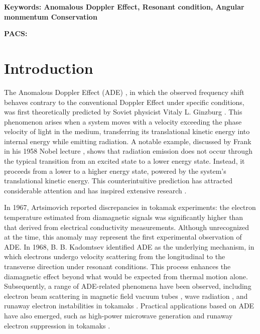 \documentclass{cpbtex3}
\begin{document}
\textbf{Keywords: Anomalous Doppler Effect, Resonant condition, Angular monmentum Conservation } %

\textbf{PACS:} %


\section{Introduction}
The Anomalous Doppler Effect (ADE) \cite{tamm1959general,frank1960optics,ginzburg1960certain,shustin1971transformation}, in which the observed frequency shift behaves contrary to the conventional Doppler Effect under specific conditions, was first theoretically predicted by Soviet physicist Vitaly L. Ginzburg \cite{ginzburg1946radiation}. This phenomenon arises when a system moves with a velocity exceeding the phase velocity of light in the medium, transferring its translational kinetic energy into internal energy while emitting radiation. A notable example, discussed by Frank in his 1958 Nobel lecture \cite{frank1960optics}, shows that radiation emission does not occur through the typical transition from an excited state to a lower energy state. Instead, it proceeds from a lower to a higher energy state, powered by the system's translational kinetic energy. This counterintuitive prediction has attracted considerable attention and has inspired extensive research \cite{nezlin1976negative,santini1984anomalous,kho1988slow,wang2016multi,guo2018control,liu2018role,shi2018superlight,filatov2021role}.

In 1967, Artsimovich \cite{artsimovich1967thermal} reported discrepancies in tokamak experiments: the electron temperature estimated from diamagnetic signals was significantly higher than that derived from electrical conductivity measurements. Although unrecognized at the time, this anomaly may represent the first experimental observation of ADE. In 1968, B. B. Kadomtsev \cite{kadomtsev1968electric} identified ADE as the underlying mechanism, in which electrons undergo velocity scattering from the longitudinal to the transverse direction under resonant conditions. This process enhances the diamagnetic effect beyond what would be expected from thermal motion alone. Subsequently, a range of ADE-related phenomena have been observed, including electron beam scattering in magnetic field vacuum tubes \cite{frank1960optics}, wave radiation \cite{spong2018first,liu2019intense,gorozhanin1997waves}, and runaway electron instabilities in tokamaks \cite{sajjad2007runaway,castejon2003particle}. Practical applications based on ADE have also emerged, such as high-power microwave generation and runaway electron suppression in tokamaks \cite{guo2018control,zhang2024self}.
\end{document}

